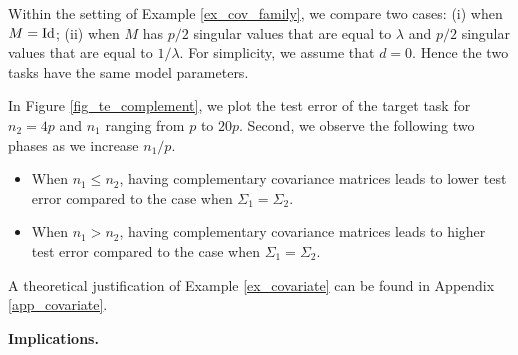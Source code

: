 \begin{example}\label{ex_covariate}
	Within the setting of Example \ref{ex_cov_family}, we compare two cases: (i) when $M = \operatorname{Id}$; (ii) when $M$ has $p/2$ singular values that are equal to $\lambda$ and $p/2$ singular values that are equal to $1 / \lambda$.
	For simplicity, we assume that $d = 0$.
	Hence the two tasks have the same model parameters.

	In Figure \ref{fig_te_complement}, we plot the test error of the target task for $n_2 = 4p$ and $n_1$ ranging from $p$ to $20p$.
	Second, we observe the following two phases as we increase $n_1 / p$.
	\begin{itemize}
		\item When $n_1 \le n_2$, having complementary covariance matrices leads to lower test error compared to the case when $\Sigma_1 = \Sigma_2$.
		\item When $n_1 > n_2$, having complementary covariance matrices leads to higher test error compared to the case when $\Sigma_1 = \Sigma_2$.
	\end{itemize}
\end{example}

A theoretical justification of Example \ref{ex_covariate} can be found in Appendix \ref{app_covariate}.


\textbf{Implications.}


